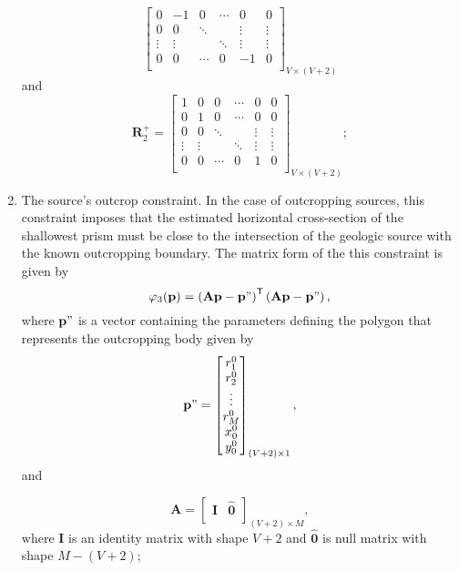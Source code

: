 \begin{enumerate}
\begin{equation}
\begin{bmatrix}
0 & -1 & 0 & \cdots & 0 & 0 \\
0 & 0 & \ddots &  & \vdots & \vdots \\
\vdots & \vdots  &  & \ddots & \vdots & \vdots\\
0 & 0 & \cdots & 0 & -1 & 0 \\
\end{bmatrix}_{V\times (V+2)}
\end{equation}
and
\begin{equation}
\mathbf{R}^{+}_{2} = 
\begin{bmatrix}
1 & 0 & 0 & \cdots & 0 & 0 \\
0 & 1 & 0 & \cdots & 0 & 0 \\
0 & 0 & \ddots &  & \vdots & \vdots \\
\vdots & \vdots  &  & \ddots & \vdots & \vdots\\
0 & 0 & \cdots & 0 & 1 & 0 \\
\end{bmatrix}_{V\times (V+2)};
\end{equation}

\item The source’s outcrop constraint. In the case of outcropping sources, this constraint imposes that the estimated horizontal cross-section of the shallowest prism must be close to the intersection of the geologic source with the known outcropping boundary. The matrix form of the this constraint is given by
\begin{equation}
\varphi_{3}(\mathbf{p}) = \left(\mathbf{A}\mathbf{p} - \mathbf{p}"\right)^\mathsf{T}\left(\mathbf{A}\mathbf{p} - \mathbf{p}"\right) ,
\end{equation}
where $\mathbf{p}"$ is a vector containing the parameters defining the polygon that represents the outcropping body given by
\begin{equation}
\mathbf{p}" = 
\begin{bmatrix}
r_{1}^{0} \\
r_{2}^{0} \\
\vdots \\
r_{M}^{0} \\
x_{0}^{0} \\
y_{0}^{0}
\end{bmatrix}_{(V+2)\times 1},
\end{equation}
and

\begin{equation}
\mathbf{A} = 
\begin{bmatrix}
\mathbf{I} & \hat{\mathbf{0}} \\
\end{bmatrix}_{(V+2)\times M},
\end{equation}
where $\mathbf{I}$ is an identity matrix with shape $V+2$ and $\hat{\mathbf{0}}$ is null matrix with shape $M -(V+2)$;


\end{enumerate}
